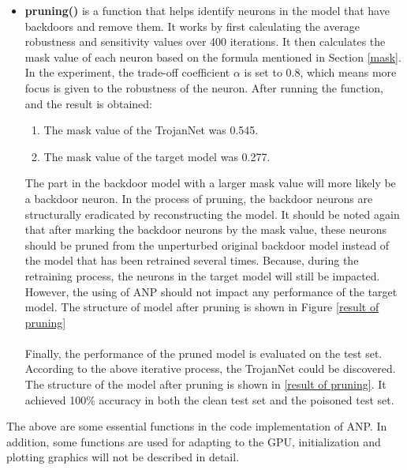 \documentclass[english,version-2022-01]{uzl-thesis}
\begin{document}
\begin{itemize}
    \begin{itemize}
        \item \textbf{pruning()} is a function that helps identify neurons in the model that have backdoors and remove them. It works by first calculating the average robustness and sensitivity values over 400 iterations. It then calculates the mask value of each neuron based on the formula mentioned in Section \ref{mask}. In the experiment, the trade-off coefficient $\alpha$ is set to 0.8, which means more focus is given to the robustness of the neuron. After running the function, and the result is obtained:
        \begin{enumerate}
        \item The mask value of the TrojanNet was 0.545.
        \item The mask value of the target model was 0.277.
        \end{enumerate} 
        The part in the backdoor model with a larger mask value will more likely be a backdoor neuron. In the process of pruning, the backdoor neurons are structurally eradicated by reconstructing the model. It should be noted again that after marking the backdoor neurons by the mask value, these neurons should be pruned from the unperturbed original backdoor model instead of the model that has been retrained several times. Because, during the retraining process, the neurons in the target model will still be impacted. However, the using of ANP should not impact any performance of the target model. The structure of model after pruning is shown in Figure \ref{result of pruning}\\ \\
        Finally, the performance of the pruned model is evaluated on the test set. According to the above iterative process, the TrojanNet could be discovered. The structure of the model after pruning is shown in \ref{result of pruning}. It achieved 100\% accuracy in both the clean test set and the poisoned test set.
    \end{itemize}
\end{itemize}
The above are some essential functions in the code implementation of ANP. In addition, some functions are used for adapting to the GPU, initialization and plotting graphics will not be described in detail.
\end{document}
